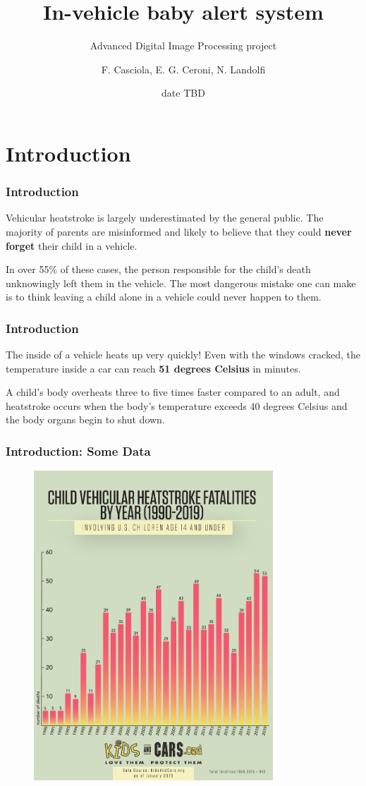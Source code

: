 \documentclass{beamer}
\title{In-vehicle baby alert system}
\subtitle{Advanced Digital Image Processing project}
\author{F. Casciola, E. G. Ceroni, N. Landolfi} %
\institute[Unisi]{Università degli Studi di Siena}
\date{date TBD}
\begin{document}
	
	\frame{\titlepage}
	
	\section{Introduction}
	
	\begin{frame}
		\frametitle{Introduction}
		Vehicular heatstroke is largely underestimated by the general public. The majority of parents are misinformed and likely to believe that they could \textbf{never forget} their child in a vehicle.
		
		\bigskip
		
		In over 55\% of these cases, the person responsible for the child’s death unknowingly left them in the vehicle. The most dangerous mistake one can make is to think leaving a child alone in a vehicle could never happen to them.
	\end{frame}

	\begin{frame}
		\frametitle{Introduction}
		The inside of a vehicle heats up very quickly! Even with the windows cracked, the temperature inside a car can reach \textbf{51 degrees Celsius} in minutes.
		
		\bigskip
				
		A child's  body overheats three to five times faster compared to an adult, and heatstroke occurs when the body's temperature exceeds 40 degrees Celsius and the body organs begin to shut down.
	\end{frame}

	\begin{frame}
		\frametitle{Introduction: Some Data}
		\begin{figure}
			\centering
			\includegraphics[width=0.8\textwidth, height=0.8\textheight]{img/heatstroke_hist.pdf}
			\label{fig:heatstroke_hist}
		\end{figure}		
	\end{frame}
\end{document}
